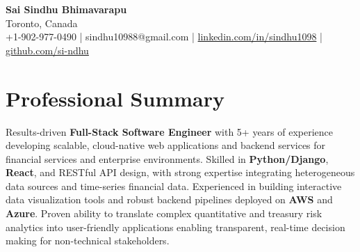 \documentclass[letterpaper,11pt]{article}
\begin{document}
\begin{center}
  {\Large \textbf{Sai Sindhu Bhimavarapu}} \\
  Toronto, Canada \\
  +1-902-977-0490 \enspace | \enspace sindhu10988@gmail.com \enspace | \enspace \href{https://www.linkedin.com/in/sindhu1098/}{linkedin.com/in/sindhu1098} \enspace | \enspace \href{https://github.com/si-ndhu}{github.com/si-ndhu}
\end{center}

\section{Professional Summary}
  \begin{itemize}[leftmargin=0.15in, label={}]
    \small{\item{
     Results-driven \textbf{Full-Stack Software Engineer} with 5+ years of experience developing scalable, cloud-native web applications and backend services for financial services and enterprise environments. Skilled in \textbf{Python/Django}, \textbf{React}, and RESTful API design, with strong expertise integrating heterogeneous data sources and time-series financial data. Experienced in building interactive data visualization tools and robust backend pipelines deployed on \textbf{AWS} and \textbf{Azure}. Proven ability to translate complex quantitative and treasury risk analytics into user-friendly applications enabling transparent, real-time decision making for non-technical stakeholders.
    }}
  \end{itemize}
\vspace{-16pt}

\end{document}
